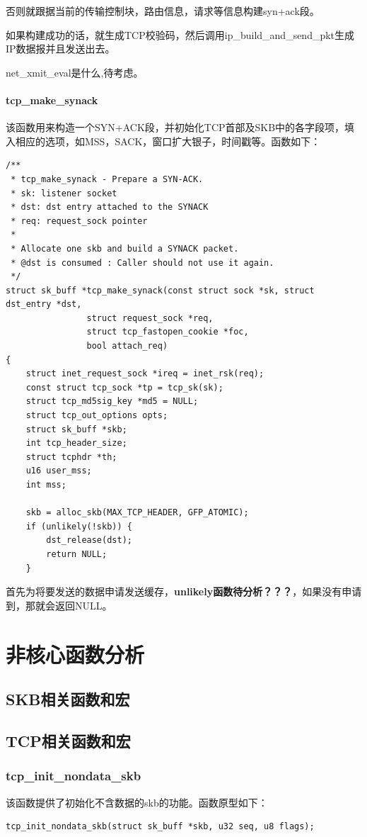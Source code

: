 \documentclass[11pt, a4paper,oneside]{book}
\theoremstyle{ocrenumbox}
\theoremstyle{purplenumbox}
\theoremstyle{blackbox}
\begin{document}
				否则就跟据当前的传输控制块，路由信息，请求等信息构建syn+ack段。

				如果构建成功的话，就生成TCP校验码，然后调用ip\_build\_and\_send\_pkt生成IP数据报并且发送出去。

				net\_xmit\_eval是什么,待考虑。
			\subsubsection{tcp\_make\_synack}
				该函数用来构造一个SYN+ACK段，并初始化TCP首部及SKB中的各字段项，填入相应的选项，如MSS，SACK，窗口扩大银子，时间戳等。函数如下：
\begin{verbatim}
/**
 * tcp_make_synack - Prepare a SYN-ACK.
 * sk: listener socket
 * dst: dst entry attached to the SYNACK
 * req: request_sock pointer
 *
 * Allocate one skb and build a SYNACK packet.
 * @dst is consumed : Caller should not use it again.
 */
struct sk_buff *tcp_make_synack(const struct sock *sk, struct dst_entry *dst,
				struct request_sock *req,
				struct tcp_fastopen_cookie *foc,
				bool attach_req)
{
	struct inet_request_sock *ireq = inet_rsk(req);
	const struct tcp_sock *tp = tcp_sk(sk);
	struct tcp_md5sig_key *md5 = NULL;
	struct tcp_out_options opts;
	struct sk_buff *skb;
	int tcp_header_size;
	struct tcphdr *th;
	u16 user_mss;
	int mss;

	skb = alloc_skb(MAX_TCP_HEADER, GFP_ATOMIC);
	if (unlikely(!skb)) {
		dst_release(dst);
		return NULL;
	}
\end{verbatim}

				首先为将要发送的数据申请发送缓存，\textbf{unlikely函数待分析？？？}，如果没有申请到，那就会返回NULL。

			
\chapter{非核心函数分析}

\minitoc

\section{SKB相关函数和宏}

\section{TCP相关函数和宏}
\subsection{tcp\_init\_nondata\_skb}
该函数提供了初始化不含数据的skb的功能。函数原型如下：
\begin{verbatim}
tcp_init_nondata_skb(struct sk_buff *skb, u32 seq, u8 flags);
\end{verbatim}
\end{document}
